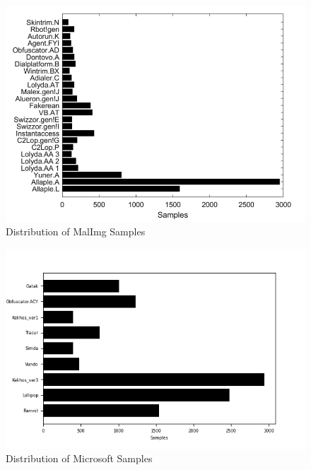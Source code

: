 \documentclass[pdflatex,sn-mathphys]{sn-jnl}%
\begin{document}
\begin{figure}[h]
\centering
        \centering
		
		\includegraphics[width=1\linewidth]{malimg-2.png}
		\caption{ Distribution of MalImg Samples}
		\label{fig:def1}
	   \end{figure}
		\begin{figure}[h]
        \centering
		
		\includegraphics[width=1\linewidth]{microsoft-distrib.png}
		\caption{ Distribution of Microsoft Samples}
		\label{fig:def2}
   \vspace{-4mm}
	\end{figure}
\end{document}
